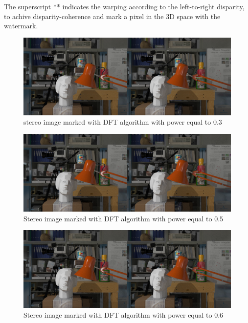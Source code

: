 The superscript ** indicates the warping according to the left-to-right disparity, to achive disparity-coherence and mark a pixel in the 3D space with the watermark.

\begin{figure}[h!]
\centering
\includegraphics[width=1\textwidth]{./img/marked_03_DFT.png}
\caption{\small{stereo image marked with DFT algorithm with power equal to 0.3}}
\label{fig:dft03}
\end{figure}
\begin{figure}[h!]
\centering
\includegraphics[width=1\textwidth]{./img/marked_05_DFT.png}
\caption{\small{Stereo image marked with DFT algorithm with power equal to 0.5}}
\label{fig:dft05}
\end{figure}
\begin{figure}[h!]
\centering
\includegraphics[width=1\textwidth]{./img/marked_06_DFT.png}
\caption{\small{Stereo image marked with DFT algorithm with power equal to 0.6}}
\label{fig:dft06}
\end{figure}
